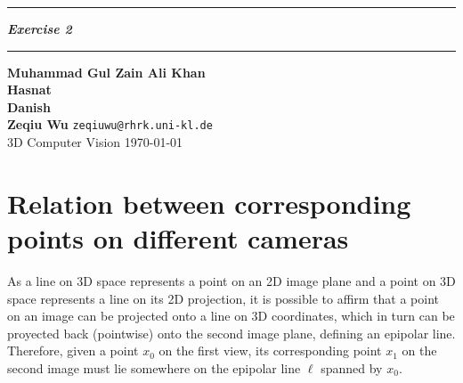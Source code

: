 \documentclass{article}
\newcommand{\squishlist}{
 \begin{list}{$\bullet$}
  { \setlength{\itemsep}{0pt}
     \setlength{\parsep}{3pt}
     \setlength{\topsep}{3pt}
     \setlength{\partopsep}{0pt}
     \setlength{\leftmargin}{1.5em}
     \setlength{\labelwidth}{1em}
     \setlength{\labelsep}{0.5em} } }
\newcommand{\squishend}{
  \end{list}  }
\begin{document}
 \def\maketitle{%
 \thispagestyle{plain}
 \vspace{-10ex}
 \hrule
 \bigskip
 \begin{center}
 {\Large{\textbf{\@title}}}
 \end{center}
 \bigskip
 \hrule

 \bigskip

 \begin{flushleft}
 \textbf{\normalsize{Muhammad Gul Zain Ali Khan}} 
 \\
 \vspace{5pt}
 \textbf{\normalsize{Hasnat}} 
 \\
 \vspace{5pt}
 \textbf{\normalsize{Danish}}
 \\
\vspace{5pt}
 \textbf{\normalsize{Zeqiu Wu}} \hfill \texttt{zeqiuwu@rhrk.uni-kl.de}
 \\
 \vspace{5pt}
 3D Computer Vision \vspace{5pt}
\hfill \today \\ 
 \end{flushleft}
 }
\def\title#1{\def\@title{#1}}
\title{\textit{Exercise 2}}




\maketitle

\section{Relation between corresponding points on different cameras}
As a line on 3D space represents a point on an 2D image plane and a point on 3D space represents a line on its 2D projection, it is possible to affirm that a point on an image can be projected onto a line on 3D coordinates, which in turn can be proyected back (pointwise) onto the second image plane, defining an epipolar line. Therefore, given a point $x_0$ on the first view, its corresponding point $x_1$ on the second image must lie somewhere on the epipolar line $\ell$ spanned by $x_0$.
\end{document}
